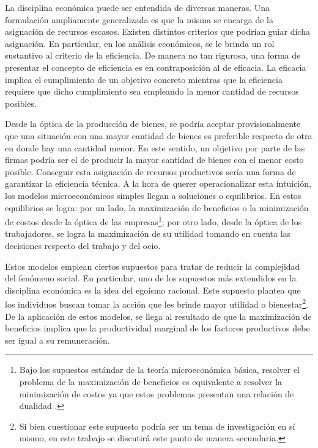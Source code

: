 
\setcounter{page}{1}

La disciplina económica puede ser entendida de diversas maneras. Una formulación ampliamente generalizada es que la misma se encarga de la asignación de recursos escasos. Existen distintos criterios que podrían guiar dicha asignación. En particular, en los análisis económicos, se le brinda un rol sustantivo al criterio de la eficiencia. De manera no tan rigurosa, una forma de presentar el concepto de eficiencia es en contraposición al de eficacia. La eficacia implica el cumplimiento de un objetivo concreto mientras que la eficiencia requiere que dicho cumplimiento sea empleando la menor cantidad de recursos posibles. 


Desde la óptica de la producción de bienes, se podría aceptar provisionalmente que una situación con una mayor cantidad de bienes es preferible respecto de otra en donde hay una cantidad menor. En este sentido, un objetivo por parte de las firmas podría ser el de producir la mayor cantidad de bienes con el menor costo posible. Conseguir esta asignación de recursos productivos sería una forma de garantizar la eficiencia técnica. A la hora de querer operacionalizar esta intuición, los modelos microeconómicos simples llegan a soluciones o equilibrios. En estos equilibrios se logra: por un lado, la maximización de beneficios o la minimización de costos desde la óptica de las empresas\footnote{Bajo los supuestos estándar de la teoría microeconómica básica, resolver el problema de la maximización de beneficios es equivalente a resolver la minimización de costos ya que estos problemas presentan una relación de dualidad \citep{MasColell_1995}.}; por otro lado, desde la óptica de los trabajadores, se logra la maximización de su utilidad tomando en cuenta las decisiones respecto del trabajo y del ocio.


Estos modelos emplean ciertos supuestos para tratar de reducir la complejidad del fenómeno social. En particular, uno de los supuestos más extendidos en la disciplina económica es la idea del egoísmo racional. Este supuesto plantea que los individuos buscan tomar la acción que les brinde mayor utilidad o bienestar\footnote{Si bien cuestionar este supuesto podría ser un tema de investigación en sí mismo, en este trabajo se discutirá este punto de manera secundaria.}. De la aplicación de estos modelos, se llega al resultado de que la maximización de beneficios implica que la productividad marginal de los factores productivos debe ser igual a su remuneración. 

